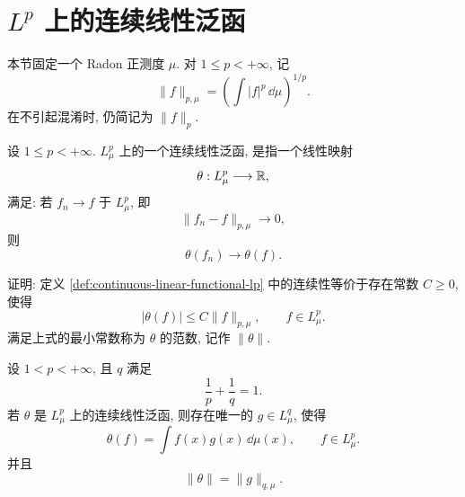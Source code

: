 \clearpage

\section{\texorpdfstring{\(L^p\)}{Lp} 上的连续线性泛函}
\label{sec:continuous-linear-functionals-on-lp}

本节固定一个 Radon 正测度 \(\mu\). 对 \(1\leq p<+\infty\), 记
\[
\|f\|_{p,\mu}
=
\left(\int |f|^p\,\dd\mu\right)^{1/p}.
\]
在不引起混淆时, 仍简记为 \(\|f\|_p\).

\begin{defn}[连续线性泛函]
	\label{def:continuous-linear-functional-lp}
	设 \(1\leq p<+\infty\). \(L^p_\mu\) 上的一个连续线性泛函, 是指一个线性映射
	\[
	\theta:L^p_\mu\longrightarrow \mathbb{R},
	\]
	满足: 若 \(f_n\to f\) 于 \(L^p_\mu\), 即
	\[
	\|f_n-f\|_{p,\mu}\to0,
	\]
	则
	\[
	\theta(f_n)\to\theta(f).
	\]
\end{defn}

\begin{exer}\label{exer:continuous-linear-functional-bounded}
	证明: 定义 \ref{def:continuous-linear-functional-lp} 中的连续性等价于存在常数 \(C\geq0\), 使得
	\[
	|\theta(f)|\leq C\|f\|_{p,\mu},
	\qquad f\in L^p_\mu.
	\]
	满足上式的最小常数称为 \(\theta\) 的范数, 记作 \(\|\theta\|\).
\end{exer}

\begin{thm}[\(L^p\) 的对偶表示]
	\label{thm:lp-dual-representation-radon}
	设 \(1<p<+\infty\), 且 \(q\) 满足
	\[
	\frac1p+\frac1q=1.
	\]
	若 \(\theta\) 是 \(L^p_\mu\) 上的连续线性泛函, 则存在唯一的
	\(g\in L^q_\mu\), 使得
	\begin{equation}
		\theta(f)=\int f(x)g(x)\,\dd\mu(x),
		\qquad f\in L^p_\mu.
		\label{eq:lp-dual-representation-radon}
	\end{equation}
	并且
	\begin{equation}
		\|\theta\|=\|g\|_{q,\mu}.
		\label{eq:lp-dual-norm-equality-radon}
	\end{equation}
\end{thm}

